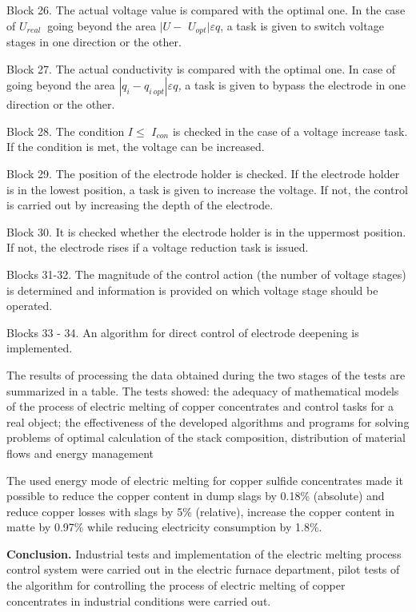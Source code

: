 Block 26. The actual voltage value is compared with the optimal one. In
the case of \(U_{real}\ \) going beyond the area \(|U -\)
\(U_{opt}|\varepsilon q\), a task is given to switch voltage stages in
one direction or the other.

Block 27. The actual conductivity is compared with the optimal one. In
case of going beyond the area
\(|q_{i} - q_{i\ opt}|\varepsilon q\)\emph{,} a task is given to bypass
the electrode in one direction or the other.

Block 28. The condition \(I \leq\) \(I_{con}\) is checked in the case of
a voltage increase task. If the condition is met, the voltage can be
increased.

Block 29. The position of the electrode holder is checked. If the
electrode holder is in the lowest position, a task is given to increase
the voltage. If not, the control is carried out by increasing the depth
of the electrode.

Block 30. It is checked whether the electrode holder is in the uppermost
position. If not, the electrode rises if a voltage reduction task is
issued.

Blocks 31-32. The magnitude of the control action (the number of voltage
stages) is determined and information is provided on which voltage stage
should be operated.

Blocks 33 - 34. An algorithm for direct control of electrode deepening
is implemented.

The results of processing the data obtained during the two stages of the
tests are summarized in a table. The tests showed: the adequacy of
mathematical models of the process of electric melting of copper
concentrates and control tasks for a real object; the effectiveness of
the developed algorithms and programs for solving problems of optimal
calculation of the stack composition, distribution of material flows and
energy management

The used energy mode of electric melting for copper sulfide concentrates
made it possible to reduce the copper content in dump slags by 0.18\%
(absolute) and reduce copper losses with slags by 5\% (relative),
increase the copper content in matte by 0.97\% while reducing
electricity consumption by 1.8\%.

\textbf{Conclusion.} Industrial tests and implementation of the electric
melting process control system were carried out in the electric furnace
department, pilot tests of the algorithm for controlling the process of
electric melting of copper concentrates in industrial conditions were
carried out.

